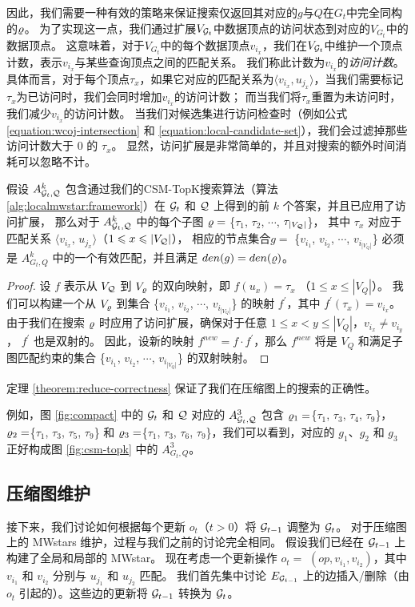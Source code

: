 因此，我们需要一种有效的策略来保证搜索仅返回其对应的$g$与$Q$在$G_t$中完全同构的$\varrho$。
为了实现这一点，我们通过扩展$V_{\mathcal{G}_t}$中数据顶点的访问状态到对应的$V_{G_t}$中的数据顶点。
这意味着，对于$V_{G_t}$中的每个数据顶点$v_{i_x}$，我们在$V_{\mathcal{G}_t}$中维护一个顶点计数，表示$v_{i_x}$与某些查询顶点之间的匹配关系。
我们称此计数为$v_{i_x}$的\emph{访问计数}。
具体而言，对于每个顶点$\tau_x$，如果它对应的匹配关系为$\langle v_{i_x}, u_{j_x} \rangle$，当我们需要标记$\tau_x$为已访问时，我们会同时增加$v_{i_x}$的访问计数；
而当我们将$\tau_x$重置为未访问时，我们减少$v_{i_x}$的访问计数。
当我们对候选集进行访问检查时（例如公式 \ref{equation:wcoj-intersection} 和 \ref{equation:local-candidate-set}），我们会过滤掉那些访问计数大于 0 的 $\tau_x$。
显然，访问扩展是非常简单的，并且对搜索的额外时间消耗可以忽略不计。
\begin{theorem} \label{theorem:reduce-correctness}
假设 $A_{\mathcal{G}_t, \mathcal{Q}}^k$ 包含通过我们的CSM-TopK搜索算法（算法 \ref{alg:localmwstar:framework}）在 $\mathcal{G}_t$ 和 $\mathcal{Q}$ 上得到的前 $k$ 个答案，并且已应用了访问扩展，
那么对于 $A_{\mathcal{G}_t, \mathcal{Q}}^k$ 中的每个子图 $\varrho=$ \{$\tau_1$, $\tau_2$, $\cdots$, $\tau_{|V_{\mathcal{Q}}|}$\}，
其中 $\tau_{x}$ 对应于匹配关系 $\langle v_{i_x}$, $u_{j_x}\rangle$（$1\leqslant x\leqslant |V_{\mathcal{Q}}|$），
相应的节点集合$g=$ \{$v_{i_1}$, $v_{i_2}$, $\cdots$, $v_{i_{|V_Q|}}$\} 必须是 $A_{G_t, Q}^k$ 中的一个有效匹配，并且满足 $den(g) = den(\varrho)$。
\end{theorem}
\begin{proof}
设 $f$ 表示从 $V_{\mathcal{Q}}$ 到 $V_{\varrho}$ 的双向映射，即 $f(u_x) = \tau_x$ （$1\leq x\leq |V_Q|$）。
我们可以构建一个从 $V_{\varrho}$ 到集合 \{$v_{i_1}$, $v_{i_2}$, $\cdots$, $v_{i_{|V_Q|}}$\} 的映射 $f^{\prime}$，其中 $f^{\prime}(\tau_x) = v_{i_x}$。
由于我们在搜索 $\varrho$ 时应用了访问扩展，确保对于任意 $1\leq x<y\leq |V_Q|$，$v_{i_x} \neq v_{i_y}$， $f^{\prime}$ 也是双射的。
因此，设新的映射 $f^{new} = f \cdot f^\prime$，那么 $f^{new}$ 将是 $V_Q$ 和满足子图匹配约束的集合 \{$v_{i_1}$, $v_{i_2}$, $\cdots$, $v_{i_{|V_Q|}}$\} 的双射映射。
\end{proof}
定理 \ref{theorem:reduce-correctness} 保证了我们在压缩图上的搜索的正确性。

例如，图 \ref{fig:compact} 中的 $\mathcal{G}_t$ 和 $\mathcal{Q}$ 对应的 $A_{\mathcal{G}_t, \mathcal{Q}}^3$ 包含 $\varrho_1=$\{$\tau_1$, $\tau_3$, $\tau_4$, $\tau_9$\}，$\varrho_2=$\{$\tau_1$, $\tau_3$, $\tau_5$, $\tau_9$\} 和 $\varrho_3=$\{$\tau_1$, $\tau_3$, $\tau_6$, $\tau_9$\}，我们可以看到，对应的 $g_1$、$g_2$ 和 $g_3$ 正好构成图 \ref{fig:csm-topk} 中的 $A_{G_t, Q}^3$。

\subsection{压缩图维护}
接下来，我们讨论如何根据每个更新 $o_t$（$t>0$）将 $\mathcal{G}_{t-1}$ 调整为 $\mathcal{G}_t$。
对于压缩图上的 MWstars 维护，过程与我们之前的讨论完全相同。
假设我们已经在 $\mathcal{G}_{t-1}$ 上构建了全局和局部的 MWstar。
现在考虑一个更新操作 $o_t=$ $(op, v_{i_1}, v_{i_2})$，其中 $v_{i_1}$ 和 $v_{i_2}$ 分别与 $u_{j_1}$ 和 $u_{j_2}$ 匹配。
%
我们首先集中讨论 $E_{\mathcal{G}_{t-1}}$ 上的边插入/删除（由 $o_t$ 引起的）。这些边的更新将 $\mathcal{G}_{t-1}$ 转换为 $\mathcal{G}_t$。

